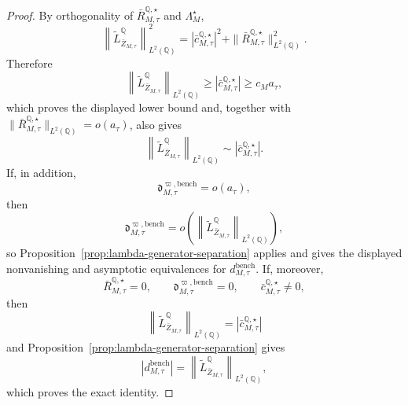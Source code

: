 \documentclass[11pt,a4paper]{amsart}
\theoremstyle{plain}
\theoremstyle{definition}
\theoremstyle{remark}
\newcommand{\QQ}{\mathbb{Q}}
\begin{document}
\begin{proof}
By orthogonality of \(\bar R_{M,\tau}^{\QQ,\star}\) and \(\Lambda_M^\star\),
\[
        \left\|
                \widetilde L_{\bar Z_{M,\tau}}^\QQ
        \right\|_{L^2(\QQ)}^2
        =
        \left|
                \bar c_{M,\tau}^{\QQ,\star}
        \right|^2
        +
        \|\bar R_{M,\tau}^{\QQ,\star}\|_{L^2(\QQ)}^2.
\]
Therefore
\[
        \left\|
                \widetilde L_{\bar Z_{M,\tau}}^\QQ
        \right\|_{L^2(\QQ)}
        \ge
        \left|
                \bar c_{M,\tau}^{\QQ,\star}
        \right|
        \ge
        c_M a_\tau,
\]
which proves the displayed lower bound and, together with
\(
        \|\bar R_{M,\tau}^{\QQ,\star}\|_{L^2(\QQ)}=o(a_\tau)
\),
also gives
\[
        \left\|
                \widetilde L_{\bar Z_{M,\tau}}^\QQ
        \right\|_{L^2(\QQ)}
        \sim
        \left|
                \bar c_{M,\tau}^{\QQ,\star}
        \right|.
\]
If, in addition,
\[
        \mathfrak d_{M,\tau}^{\varpi,\mathrm{bench}}
        =
        o(a_\tau),
\]
then
\[
        \mathfrak d_{M,\tau}^{\varpi,\mathrm{bench}}
        =
        o\!\left(
                \left\|
                        \widetilde L_{\bar Z_{M,\tau}}^\QQ
                \right\|_{L^2(\QQ)}
        \right),
\]
so Proposition~\ref{prop:lambda-generator-separation} applies and gives the displayed
nonvanishing and asymptotic equivalences for \(d_{M,\tau}^{\mathrm{bench}}\).
If, moreover,
\[
        \bar R_{M,\tau}^{\QQ,\star}=0,
        \qquad
        \mathfrak d_{M,\tau}^{\varpi,\mathrm{bench}}=0,
        \qquad
        \bar c_{M,\tau}^{\QQ,\star}\neq0,
\]
then
\[
        \left\|
                \widetilde L_{\bar Z_{M,\tau}}^\QQ
        \right\|_{L^2(\QQ)}
        =
        \left|
                \bar c_{M,\tau}^{\QQ,\star}
        \right|
\]
and Proposition~\ref{prop:lambda-generator-separation} gives
\[
        \left|
                d_{M,\tau}^{\mathrm{bench}}
        \right|
        =
        \left\|
                \widetilde L_{\bar Z_{M,\tau}}^\QQ
        \right\|_{L^2(\QQ)},
\]
which proves the exact identity.
\end{proof}
\end{document}
